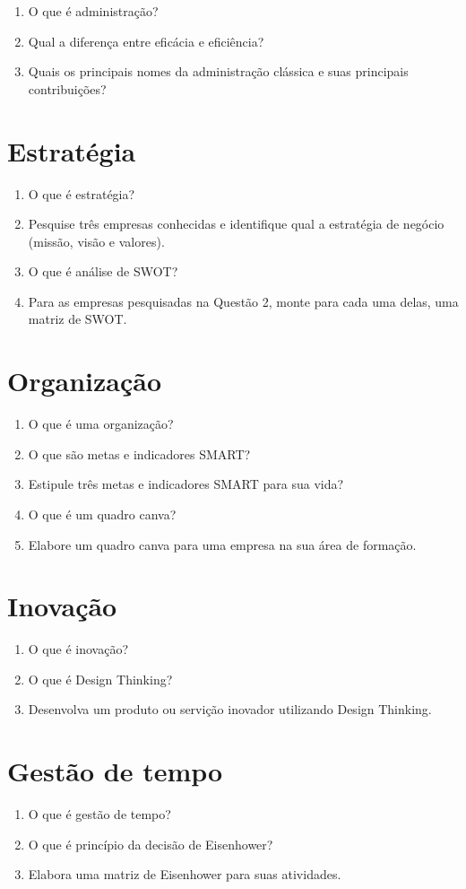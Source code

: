\documentclass[11pt]{article}
\begin{document}
	\begin{enumerate}
		\item O que é administra\c cão?
		\item Qual a diferen\c ca entre eficácia e eficiência?
		\item Quais os principais nomes da administra\c cão clássica e suas principais contribui\c cões?
	\end{enumerate}
	
	\newpage
	\section{Estratégia}

	\begin{enumerate}
		\item O que é estratégia?
		\item Pesquise três empresas conhecidas e identifique qual a estratégia de negócio (missão, visão e valores).
		\item O que é análise de SWOT?
		\item Para as empresas pesquisadas na Questão 2, monte para cada uma delas, uma matriz de SWOT.
	\end{enumerate}	

	\newpage
	\section{Organiza\c cão}

	\begin{enumerate}
		\item O que é uma organiza\c cão?
		\item O que são metas e indicadores SMART?
		\item Estipule três metas e indicadores SMART para sua vida?
		\item O que é um quadro canva?
		\item Elabore um quadro canva para uma empresa na sua área de forma\c cão.
	\end{enumerate}	

	\newpage
	\section{Inova\c cão}

	\begin{enumerate}
		\item O que é inova\c cão?
		\item O que é Design Thinking?
		\item Desenvolva um produto ou servi\c cão inovador utilizando Design Thinking.
	\end{enumerate}

	\newpage
	\section{Gestão de tempo}

	\begin{enumerate}
		\item O que é gestão de tempo?
		\item O que é princípio da decisão de Eisenhower?
		\item Elabora uma matriz de Eisenhower para suas atividades.
	\end{enumerate}
\end{document}
